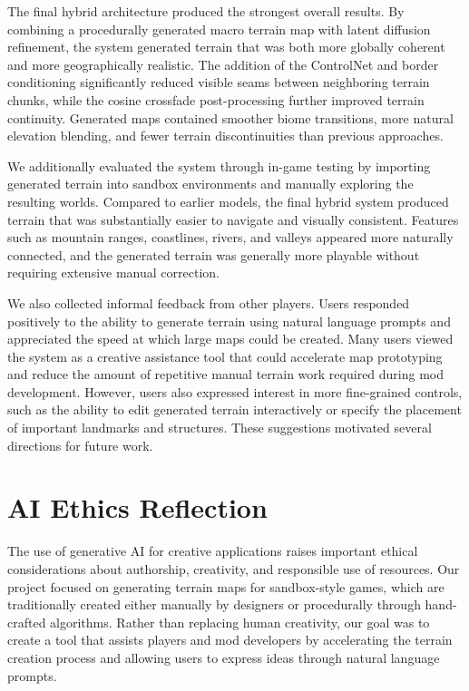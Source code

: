 \documentclass[conference]{IEEEtran}
\begin{document}
The final hybrid architecture produced the strongest overall results. By combining a procedurally generated macro terrain map with latent diffusion refinement, the system generated terrain that was both more globally coherent and more geographically realistic. The addition of the ControlNet and border conditioning significantly reduced visible seams between neighboring terrain chunks, while the cosine crossfade post-processing further improved terrain continuity. Generated maps contained smoother biome transitions, more natural elevation blending, and fewer terrain discontinuities than previous approaches.

We additionally evaluated the system through in-game testing by importing generated terrain into sandbox environments and manually exploring the resulting worlds. Compared to earlier models, the final hybrid system produced terrain that was substantially easier to navigate and visually consistent. Features such as mountain ranges, coastlines, rivers, and valleys appeared more naturally connected, and the generated terrain was generally more playable without requiring extensive manual correction.

We also collected informal feedback from other players. Users responded positively to the ability to generate terrain using natural language prompts and appreciated the speed at which large maps could be created. Many users viewed the system as a creative assistance tool that could accelerate map prototyping and reduce the amount of repetitive manual terrain work required during mod development. However, users also expressed interest in more fine-grained controls, such as the ability to edit generated terrain interactively or specify the placement of important landmarks and structures. These suggestions motivated several directions for future work.

\section{AI Ethics Reflection}

The use of generative AI for creative applications raises important ethical considerations about authorship, creativity, and responsible use of resources. Our project focused on generating terrain maps for sandbox-style games, which are traditionally created either manually by designers or procedurally through hand-crafted algorithms. Rather than replacing human creativity, our goal was to create a tool that assists players and mod developers by accelerating the terrain creation process and allowing users to express ideas through natural language prompts.
\end{document}
